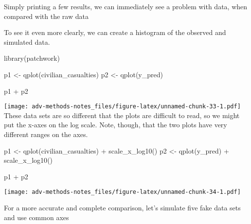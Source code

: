 \documentclass[
]{book}
\newenvironment{Shaded}{\begin{snugshade}}{\end{snugshade}}
\newcommand{\FunctionTok}[1]{\textcolor[rgb]{0.00,0.00,0.00}{#1}}
\newcommand{\NormalTok}[1]{#1}
\newcommand{\OtherTok}[1]{\textcolor[rgb]{0.56,0.35,0.01}{#1}}
\newcommand{\SpecialCharTok}[1]{\textcolor[rgb]{0.00,0.00,0.00}{#1}}
\begin{document}
Simply printing a few results, we can immediately see a problem with
data, when compared with the raw data

To see it even more clearly, we can create a histogram of the observed
and simulated data.

\begin{Shaded}
\begin{Highlighting}[]
\FunctionTok{library}\NormalTok{(patchwork)}

\NormalTok{p1 }\OtherTok{\textless{}{-}} \FunctionTok{qplot}\NormalTok{(civilian\_casualties)}
\NormalTok{p2 }\OtherTok{\textless{}{-}} \FunctionTok{qplot}\NormalTok{(y\_pred)}

\NormalTok{p1 }\SpecialCharTok{+}\NormalTok{ p2}
\end{Highlighting}
\end{Shaded}

\texttt{[image: adv-methods-notes\_files/figure-latex/unnamed-chunk-33-1.pdf]}
These data sets are so different that the plots are difficult to read,
so we might put the x-axes on the log scale. Note, though, that the two
plots have very different ranges on the axes.

\begin{Shaded}
\begin{Highlighting}[]
\NormalTok{p1 }\OtherTok{\textless{}{-}} \FunctionTok{qplot}\NormalTok{(civilian\_casualties) }\SpecialCharTok{+} \FunctionTok{scale\_x\_log10}\NormalTok{()}
\NormalTok{p2 }\OtherTok{\textless{}{-}} \FunctionTok{qplot}\NormalTok{(y\_pred) }\SpecialCharTok{+} \FunctionTok{scale\_x\_log10}\NormalTok{()}

\NormalTok{p1 }\SpecialCharTok{+}\NormalTok{ p2}
\end{Highlighting}
\end{Shaded}

\texttt{[image: adv-methods-notes\_files/figure-latex/unnamed-chunk-34-1.pdf]}

For a more accurate and complete comparison, let's simulate five fake
data sets and use common axes
\end{document}
